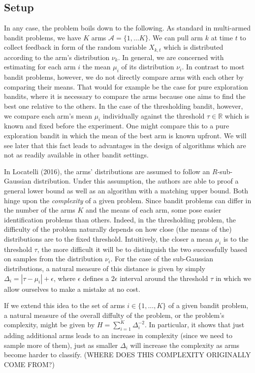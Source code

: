 \documentclass[12pt,]{article}
\begin{document}
\subsection{Setup}\label{setup}

In any case, the problem boils down to the following. As standard in
multi-armed bandit problems, we have \(K\) arms
\(\mathcal{A} = \{1, \dots K\}\). We can pull arm \(k\) at time \(t\) to
collect feedback in form of the random variable \(X_{k,t}\) which is
distributed according to the arm's distribution \(\nu_k\). In general,
we are concerned with estimating for each arm \(i\) the mean \(\mu_i\)
of its distribution \(\nu_i\). In contrast to most bandit problems,
however, we do not directly compare arms with each other by comparing
their means. That would for example be the case for pure exploration
bandits, where it is necessary to compare the arms because one aims to
find the best one relative to the others. In the case of the
thresholding bandit, however, we compare each arm's mean \(\mu_i\)
individually against the threshold \(\tau \in \mathbb{R}\) which is
known and fixed before the experiment. One might compare this to a pure
exploration bandit in which the mean of the best arm is known upfront.
We will see later that this fact leads to advantages in the design of
algorithms which are not as readily available in other bandit settings.

In Locatelli (2016), the arms' distributions are assumed to follow an
\(R\)-sub-Gaussian distribution. Under this assumption, the authors are
able to proof a general lower bound as well as an algorithm with a
matching upper bound. Both hinge upon the \emph{complexity} of a given
problem. Since bandit problems can differ in the number of the arms
\(K\) and the means of each arm, some pose easier identification
problems than others. Indeed, in the thresholding problem, the
difficulty of the problem naturally depends on how close (the means of
the) distributions are to the fixed threshold. Intuitively, the closer a
mean \(\mu_i\) is to the threshold \(\tau\), the more difficult it will
be to distinguish the two successfully based on samples from the
distribution \(\nu_i\). For the case of the sub-Gaussian distributions,
a natural measure of this distance is given by simply
\(\Delta_i = |\tau - \mu_i| + \epsilon\), where \(\epsilon\) defines a
\(2\epsilon\) interval around the threshold \(\tau\) in which we allow
ourselves to make a mistake at no cost.

If we extend this idea to the set of arms \(i \in \{1,...,K\}\) of a
given bandit problem, a natural measure of the overall diffulty of the
problem, or the problem's complexity, might be given by
\(H = \sum_{i=1}^{K} \Delta_i^{-2}\). In particular, it shows that just
adding additional arms leads to an increase in complexity (since we need
to sample more of them), just as smaller \(\Delta_i\) will increase the
complexity as arms become harder to classify. (WHERE DOES THIS
COMPLEXITY ORIGINALLY COME FROM?)
\end{document}
